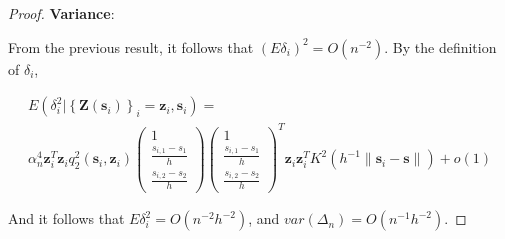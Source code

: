 \documentclass[authoryear,review, 12pt]{elsarticle}
\begin{document}
\begin{proof}
\textbf{Variance}:

From the previous result, it follows that $\left(E\delta_{i}\right)^{2}=O\left(n^{-2}\right)$.
By the definition of $\delta_{i}$,

\begin{multline*}
E\left(\delta_{i}^{2}|\left\{ \bm{Z}\left(\bm{s}_{i}\right)\right\} _{i}=\bm{z}_{i},\bm{s}_{i}\right)=\\
\alpha_{n}^{4}\bm{z}_{i}^{T}\bm{z}_{i}q_{2}^{2}\left(\bm{s}_{i},\bm{z}_{i}\right)\left(\begin{array}{c}
1\\
\frac{s_{i,1}-s_{1}}{h}\\
\frac{s_{i,2}-s_{2}}{h}
\end{array}\right)\left(\begin{array}{c}
1\\
\frac{s_{i,1}-s_{1}}{h}\\
\frac{s_{i,2}-s_{2}}{h}
\end{array}\right)^{T}\bm{z}_{i}\bm{z}_{i}^{T}K^{2}\left(h^{-1}\|\bm{s}_{i}-\bm{s}\|\right)+o\left(1\right)
\end{multline*}


And it follows that $E\delta_{i}^{2}=O\left(n^{-2}h^{-2}\right)$,
and $var\left(\Delta_{n}\right)=O\left(n^{-1}h^{-2}\right)$.
\end{proof}



\end{document}

